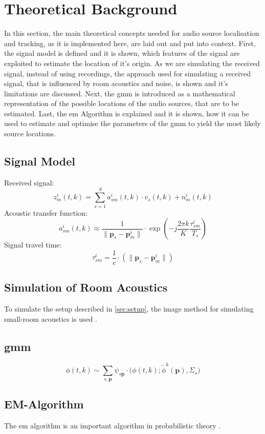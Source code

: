 \chapter{Theoretical Background}
In this section, the main theoretical concepts needed for audio source localisation and tracking, as it is implemented here, are laid out and put into context. First, the signal model is defined and it is shown, which features of the signal are exploited to estimate the location of it's origin. As we are simulating the received signal, instead of using recordings, the approach used for simulating a received signal, that is influenced by room acoustics and noise, is shown and it's limitations are discussed. Next, the  \gls{gmm} is introduced as a mathematical representation of the possible locations of the audio sources, that are to be estimated. Last, the  \gls{em} Algorithm is explained and it is shown, how it can be used to estimate and optimise the parameters of the \gls{gmm} to yield the most likely source locations.

\section{Signal Model}
\label{sec:signal}
Received signal:
\begin{equation}
	z_m^i(t,k)=\sum_{s=1}^{S}a_{sm}^i(t,k)\cdot v_s(t,k)+n_m^i(t,k)
\end{equation}
Acoustic transfer function:
\begin{equation}
	a_{sm}^i(t,k)\approx\frac{1}{\|\mathbf{p}_s-\mathbf{p}_m^i\|}\cdot\exp{\left(-j\frac{2\pi k}{K}\frac{\tau^i_{sm}}{T_s}\right)}
\end{equation}
Signal travel time:
\begin{equation}
	\tau^i_{sm}=\frac{1}{c}\cdot\left(\|\mathbf{p}_s-\mathbf{p}_m^i\|\right)
\end{equation}

\section{Simulation of Room Acoustics}
\label{sec:simulation}
To simulate the setup described in \ref{sec:setup}, the image method for simulating small-room acoustics is used \cite{Allen1979}.

\section{\acrfull{gmm}}
\label{sec:gmm}
\begin{equation}
	\phi(t,k)\sim\sum_{s,\mathbf{p}}\psi_{s\mathbf{p}}\cdot\big(\phi(t,k);\tilde\phi^k(\mathbf{p}),\Sigma_s\big)
\end{equation}

\section{EM-Algorithm}
\label{sec:em}
The \acrfull{em} algorithm is an important algorithm in probabilistic theory \cite{Schwartz2014}.